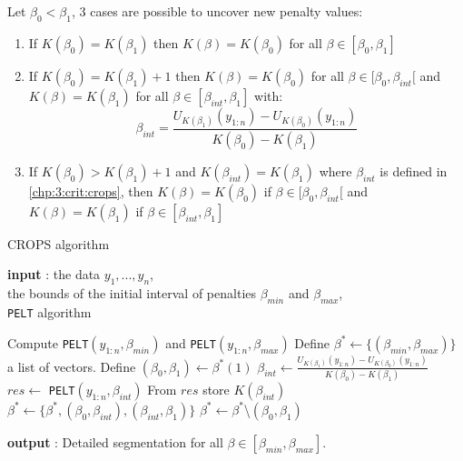 \begin{theorem}
Let $\beta_0 < \beta_1$, 3 cases are possible to uncover new penalty values:
\begin{enumerate}
  \item If $K(\beta_0) = K(\beta_1)$ then $K(\beta) = K(\beta_0)$ for all $\beta \in [\beta_0,\beta_1]$
  \item If $K(\beta_0) = K(\beta_1)+1$ then $K(\beta) = K(\beta_0)$ for all $\beta\in[\beta_0,\beta_{int}[$ and $K(\beta) = K(\beta_1)$ for all $\beta\in[\beta_{int},\beta_1]$ with:
  \begin{equation}\label{chp:3:crit:crops}
    \beta_{int} = \frac{U_{K(\beta_1)}(y_{1:n})-U_{K(\beta_0)}(y_{1:n})}{K(\beta_0)-K(\beta_1)}
  \end{equation}
  \item If $K(\beta_0) > K(\beta_1)+1$ and $K(\beta_{int}) = K(\beta_1)$ where $\beta_{int}$ is defined in \ref{chp:3:crit:crops}, then $K(\beta) = K(\beta_0)$ if $\beta\in[\beta_0,\beta_{int}[$ and $K(\beta) = K(\beta_1)$ if $\beta\in [\beta_{int},\beta_1]$
\end{enumerate}
\end{theorem} 

\begin{algorithm}[ht]
\caption{CROPS algorithm}\label{chp:3:algocrops}
\begin{algorithmic}

\State \textbf{input} : the data $y_{1},...,y_{n}$, \\
the bounds of the initial interval of penalties $\beta_{min}$ and $\beta_{max}$, \\
\texttt{PELT} algorithm 
  
\State Compute \texttt{PELT}$(y_{1:n},\beta_{min})$ and \texttt{PELT}$(y_{1:n},\beta_{max})$ 
\State Define $\beta^* \gets \{(\beta_{min},\beta_{max})\}$ a list of vectors.  
\While{$\beta^*\neq \emptyset$}
  \State Define $(\beta_0, \beta_1) \gets \beta^*(1)$
    \State $\beta_{int} \gets \frac{U_{K(\beta_1)}(y_{1:n})-U_{K(\beta_0)}(y_{1:n})}{K(\beta_0)-K(\beta_1)}$
    \State $res \gets$ \texttt{PELT}$(y_{1:n},\beta_{int})$
    \State From $res$ store $K(\beta_{int})$
      \State $\beta^* \gets \{\beta^*,(\beta_0,\beta_{int}),(\beta_{int},\beta_1)\}$
    \EndIf
  \EndIf
  \State $\beta^* \gets \beta^*$\textbackslash$(\beta_0,\beta_1)$
\EndWhile 
   
\State \textbf{output} : Detailed segmentation for all $\beta \in [\beta_{min},\beta_{max}]$. 
\end{algorithmic}
\end{algorithm} 

